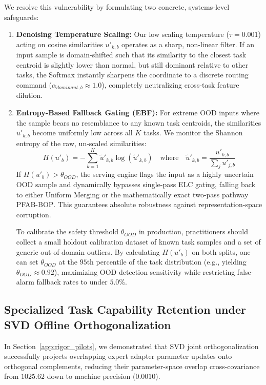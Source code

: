\documentclass{article}
\theoremstyle{plain}
\theoremstyle{definition}
\theoremstyle{remark}
\begin{document}
We resolve this vulnerability by formulating two concrete, systems-level safeguards:
\begin{enumerate}
  \item \textbf{Denoising Temperature Scaling:} Our low scaling temperature ($\tau = 0.001$) acting on cosine similarities $u'_{k,b}$ operates as a sharp, non-linear filter. If an input sample is domain-shifted such that its similarity to the closest task centroid is slightly lower than normal, but still dominant relative to other tasks, the Softmax instantly sharpens the coordinate to a discrete routing command ($\alpha_{dominant, b} \approx 1.0$), completely neutralizing cross-task feature dilution.
  \item \textbf{Entropy-Based Fallback Gating (EBF):} For extreme OOD inputs where the sample bears no resemblance to any known task centroids, the similarities $u'_{k,b}$ become uniformly low across all $K$ tasks. We monitor the Shannon entropy of the raw, un-scaled similarities:
  \begin{equation}
    H(u'_b) = -\sum_{k=1}^K \tilde{u}'_{k, b} \log(\tilde{u}'_{k, b}) \quad \text{where} \quad \tilde{u}'_{k,b} = \frac{u'_{k, b}}{\sum_j u'_{j, b}}
  \end{equation}
  If $H(u'_b) > \theta_{OOD}$, the serving engine flags the input as a highly uncertain OOD sample and dynamically bypasses single-pass ELC gating, falling back to either Uniform Merging or the mathematically exact two-pass pathway \textsc{PFAB-BOP}. This guarantees absolute robustness against representation-space corruption.
  
  To calibrate the safety threshold $\theta_{OOD}$ in production, practitioners should collect a small holdout calibration dataset of known task samples and a set of generic out-of-domain outliers. By calculating $H(u'_b)$ on both splits, one can set $\theta_{OOD}$ at the $95\text{th}$ percentile of the task distribution (e.g., yielding $\theta_{OOD} \approx 0.92$), maximizing OOD detection sensitivity while restricting false-alarm fallback rates to under $5.0\%$.
\end{enumerate}

\subsection{Specialized Task Capability Retention under SVD Offline Orthogonalization}
In Section~\ref{app:rigor_pilots}, we demonstrated that SVD joint orthogonalization successfully projects overlapping expert adapter parameter updates onto orthogonal complements, reducing their parameter-space overlap cross-covariance from $1025.62$ down to machine precision ($0.0010$).
\end{document}
